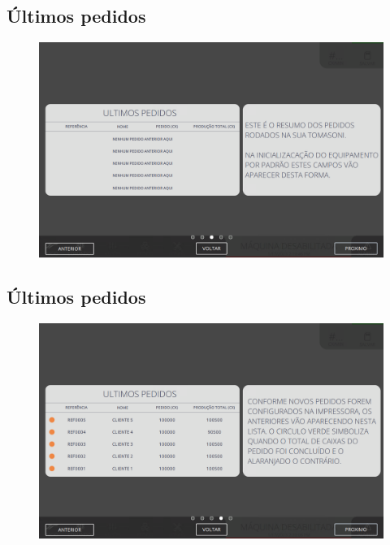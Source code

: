 \newpage
\thispagestyle{fancy}
\vspace*{40 pt}
\subsection{\small{Últimos pedidos}}
\vspace*{\fill}
\begin{figure}[h]
    \centering
    \includegraphics[width=576 px,height=360 px]{src/imagesICV/01-main/4.png}
\end{figure}
\vspace*{\fill}

\newpage
\thispagestyle{fancy}
\vspace*{40 pt}
\subsection{\small{Últimos pedidos}}
\vspace*{\fill}
\begin{figure}[h]
    \centering
    \includegraphics[width=576 px,height=360 px]{src/imagesICV/01-main/5.png}
\end{figure}
\vspace*{\fill}


